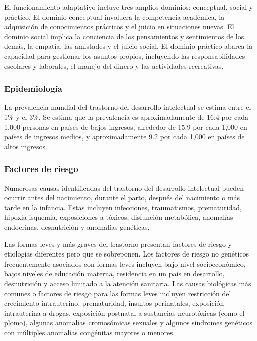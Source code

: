 \documentclass[11pt,letterpaper]{report}
\begin{document}
El funcionamiento adaptativo incluye tres amplios dominios: conceptual, social
y práctico. El dominio conceptual involucra la competencia académica, la
adquisición de conocimientos prácticos y el juicio en situaciones nuevas. El
dominio social implica la conciencia de los pensamientos y sentimientos de los
demás, la empatía, las amistades y el juicio social. El dominio práctico abarca
la capacidad para gestionar los asuntos propios, incluyendo las
responsabilidades escolares y laborales, el manejo del dinero y las
actividades recreativas. \cite{Simms2023}

\subsubsection{Epidemiología}
La prevalencia mundial del trastorno del desarrollo intelectual se estima
entre el 1\% y el 3\%. Se estima que la prevalencia es aproximadamente de 16.4
por cada 1,000 personas en países de bajos ingresos, alrededor de 15.9 por cada
1,000 en países de ingresos medios, y aproximadamente 9.2 por cada 1,000 en
países de altos ingresos. \cite{vanKarnebeek2018, Nelson56}

\subsubsection{Factores de riesgo}
Numerosas causas identificadas del trastorno del desarrollo intelectual pueden
ocurrir antes del nacimiento, durante el parto, después del nacimiento o más 
tarde en la infancia. Estas incluyen infecciones, traumatismos, prematuridad,
hipoxia-isquemia, exposiciones a tóxicos, disfunción metabólica, anomalías
endocrinas, desnutrición y anomalías genéticas. \cite{Nelson56}

Las formas leves y más graves del trastorno presentan factores de riesgo y
etiologías diferentes pero que se sobreponen. Los factores de riesgo no
genéticos frecuentemente asociados con formas leves incluyen bajo nivel
socioeconómico, bajos niveles de educación materna, residencia en un país en
desarrollo, desnutrición y acceso limitado a la atención sanitaria. Las causas
biológicas más comunes o factores de riesgo para las formas leves incluyen
restricción del crecimiento intrauterino, prematuridad, insultos perinatales,
exposición intrauterina a drogas, exposición postnatal a sustancias
neurotóxicas (como el plomo), algunas anomalías cromosómicas sexuales y algunos
síndromes genéticos con múltiples anomalías congénitas mayores o menores.
\cite{Nelson56}
\end{document}
